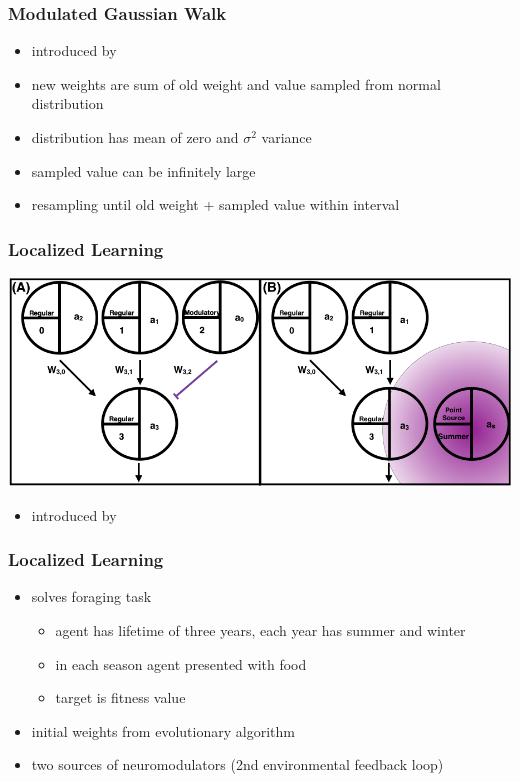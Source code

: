 \documentclass[14pt]{beamer}
\theoremstyle{remark}
\begin{document}
\begin{frame}[t]
    \frametitle{Modulated Gaussian Walk}
    \begin{itemize}
        \item introduced by \cite{Toutounji2016}
        \vfill
  	    \item new weights are sum of old weight and value sampled from normal distribution
        \vfill
        \item distribution has mean of zero and \(\sigma^2\) variance
        \vfill
        \item sampled value can be infinitely large
        \vfill
        \item resampling until old weight + sampled value within interval
	\end{itemize}
\end{frame}

\begin{frame}[t]
    \frametitle{Localized Learning}
    \centering
    \includegraphics[scale=0.75]{sources-drawing}
    \begin{itemize}
        \item introduced by \cite{Velez2017}
	\end{itemize}
\end{frame}

\begin{frame}[t]
    \frametitle{Localized Learning}
    \begin{itemize}
        \item solves foraging task
        \begin{itemize}
            \item agent has lifetime of three years, each year has summer and winter
            \item in each season agent presented with food
            \item target is fitness value
        \end{itemize}
        \vfill
        \item initial weights from evolutionary algorithm
        \vfill
        \item two sources of neuromodulators (2nd environmental feedback loop)
	\end{itemize}
\end{frame}
\end{document}
